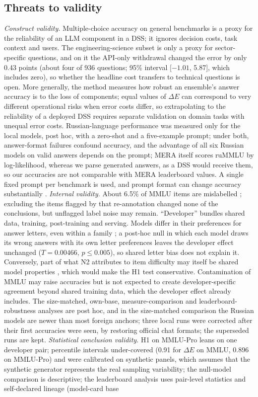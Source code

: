 \documentclass[preprint,12pt,authoryear]{elsarticle}
\newcommand{\dE}{\Delta E}
\begin{document}
\subsection{Threats to validity}
\emph{Construct validity.} Multiple-choice accuracy on general benchmarks is a proxy for the reliability of an LLM component in a DSS; it ignores decision costs, task context and users. The engineering-science subset is only a proxy for sector-specific questions, and on it the API-only withdrawal changed the error by only 0.43 points (about four of 936 questions; 95\% interval [$-1.01$, 5.87], which includes zero), so whether the headline cost transfers to technical questions is open. More generally, the method measures how robust an ensemble's answer accuracy is to the loss of components; equal values of $\dE$ can correspond to very different operational risks when error costs differ, so extrapolating to the reliability of a deployed DSS requires separate validation on domain tasks with unequal error costs. Russian-language performance was measured only for the local models, post hoc, with a zero-shot and a five-example prompt; under both, answer-format failures confound accuracy, and the advantage of all six Russian models on valid answers depends on the prompt; MERA itself scores ruMMLU by log-likelihood, whereas we parse generated answers, as a DSS would receive them, so our accuracies are not comparable with MERA leaderboard values. A single fixed prompt per benchmark is used, and prompt format can change accuracy substantially \citep{sclar2024format}. \emph{Internal validity.} About 6.5\% of MMLU items are mislabelled \citep{gema2025mmlu}; excluding the items flagged by that re-annotation changed none of the conclusions, but unflagged label noise may remain. ``Developer'' bundles shared data, training, post-training and serving. Models differ in their preferences for answer letters, even within a family \citep{alzahrani2024benchmarks}; a post-hoc null in which each model draws its wrong answers with its own letter preferences leaves the developer effect unchanged ($T=0.00466$, $p\le0.005$), so shared letter bias does not explain it. Conversely, part of what N2 attributes to item difficulty may itself be shared model properties \citep{toups2023ecosystem}, which would make the H1 test conservative. Contamination of MMLU \citep{zhao2025mmlucf} may raise accuracies but is not expected to create developer-specific agreement beyond shared training data, which the developer effect already includes. The size-matched, own-base, measure-comparison and leaderboard-robustness analyses are post hoc, and in the size-matched comparison the Russian models are newer than most foreign anchors; three local runs were corrected after their first accuracies were seen, by restoring official chat formats; the superseded runs are kept. \emph{Statistical conclusion validity.} H1 on MMLU-Pro leans on one developer pair; percentile intervals under-covered (0.91 for $\dE$ on MMLU, 0.896 on MMLU-Pro) and were calibrated on synthetic panels, which assumes that the synthetic generator represents the real sampling variability; the null-model comparison is descriptive; the leaderboard analysis uses pair-level statistics and self-declared lineage (model-card base 
\end{document}

